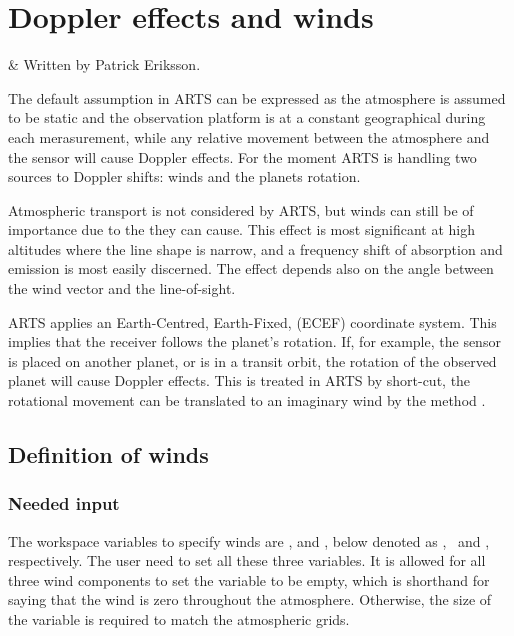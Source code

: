 \chapter{Doppler effects and winds}
 \label{sec:winds}


  & Written by Patrick Eriksson.\\
 \stophistory


 The default assumption in ARTS can be expressed as the atmosphere is assumed
 to be static and the observation platform is at a constant geographical during
 each merasurement, while any relative movement between the atmosphere and the
 sensor will cause Doppler effects. For the moment ARTS is handling two sources
 to Doppler shifts: winds and the planets rotation.

 Atmospheric transport is not considered by ARTS, but winds can still be of
 importance due to the  they can cause. This effect
 is most significant at high altitudes where the line shape is narrow, and a
 frequency shift of absorption and emission is most easily discerned. The
 effect depends also on the angle between the wind vector and the
 line-of-sight.

 ARTS applies an Earth-Centred, Earth-Fixed, (ECEF) coordinate system. This
 implies that the receiver follows the planet's rotation. If, for example, the
 sensor is placed on another planet, or is in a transit orbit, the rotation of
 the observed planet will cause Doppler effects. This is treated in ARTS by
 short-cut, the rotational movement can be translated to an imaginary wind by
 the method .


\section{Definition of winds}
\label{sec:winds:defs}

\subsection{Needed input}
%
The workspace variables to specify winds are ,
 and , below denoted as
\WindWE, \WindSN\ and \WindVe, respectively. The user need to set all these
three variables. It is allowed for all three wind components to set the
variable to be empty, which is shorthand for saying that the wind is zero
throughout the atmosphere. Otherwise, the size of the variable is required to
match the atmospheric grids. 

